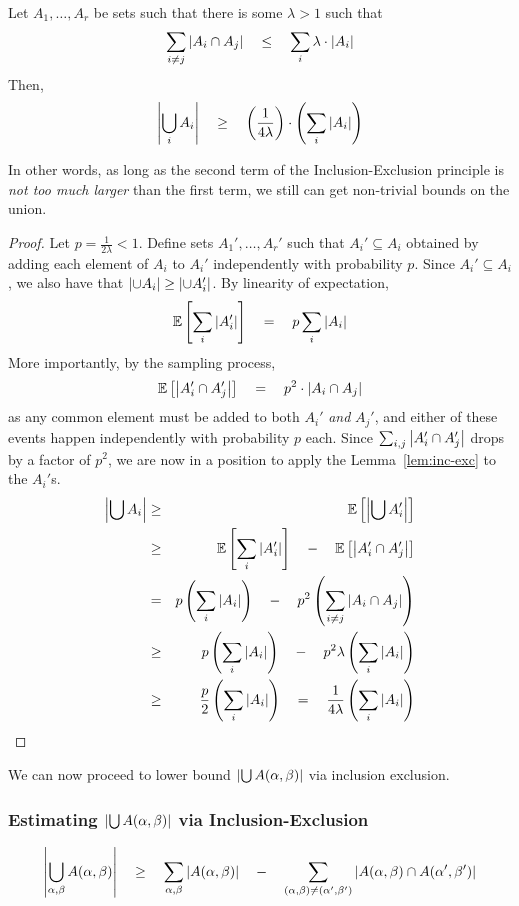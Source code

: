 \documentclass{beatcs}
\newcommand{\spaced}[1]{\quad#1\quad}
\begin{document}
\begin{lemma}\label{lem:str-inc-exc}
Let $A_1,\dots, A_r$ be sets such that there is some $\lambda > 1$ such that
\[
\sum_{i\neq j} \abs{A_i \intersection A_j} \spaced{\leq} \sum_i \lambda \cdot \abs{A_i}
\]
Then, 
\[
\abs{\Union_i A_i} \spaced{\geq} \inparen{\frac{1}{4\lambda}} \cdot \inparen{\sum_i \abs{A_i}}
\]
\end{lemma}

In other words, as long as the second term of the Inclusion-Exclusion principle is \emph{not too much larger} than the first term, we still can get non-trivial bounds on the union. 

\begin{proof}
Let $p = \frac{1}{2\lambda} < 1$. Define sets $A_1',\dots, A_r'$ such that $A_i' \subseteq A_i$ obtained by adding each element of $A_i$ to $A_i'$ independently with probability $p$. Since $A_i' \subseteq A_i$, we also have that $\left|\cup A_i\right| \geq \left|\cup  A_i'\right|$. By linearity of expectation, 
\[
\E\insquare{\sum_i \abs{A_i'}} \spaced{=} p \sum_{i} \abs{A_i} 
\]
More importantly, by the sampling process,
\[
\E\insquare{\abs{A_i' \intersection A_j'}} \spaced{=} p^2 \cdot \abs{A_i \intersection A_j}
\]
as any common element must be added to both $A_i'$ \emph{and} $A_j'$, and either of these events happen independently with probability $p$ each. Since $\sum_{i,j}\left|A_i' \cap A_j'\right|$ drops by a factor of $p^2$, we are now in a position to apply the Lemma~\ref{lem:inc-exc} to the $A_i'$s. 
\begin{eqnarray*}
\abs{\Union A_i} & \geq &  \E\insquare{\abs{\Union A_i'}}\\
& \geq & \E\insquare{\sum_i \abs{A_i'}} \spaced{-} \E\insquare{\abs{A_i' \intersection A_j'}}\\
& = & p \inparen{\sum_i \abs{A_i}} \spaced{-} p^2\inparen{\sum_{i\neq j}\abs{A_i \intersection A_j}}\\
& \geq & p \inparen{\sum_i \abs{A_i}} \spaced{-} p^2 \lambda \inparen{\sum_i \abs{A_i}}\\
& \geq & \frac{p}{2} \inparen{\sum_i \abs{A_i}} \spaced{=} \frac{1}{4\lambda} \inparen{\sum_i \abs{A_i}}
\end{eqnarray*}
\end{proof}

We can now proceed to lower bound $\left|\bigcup A(\alpha, \beta)\right|$ via inclusion exclusion.

\subsubsection*{Estimating $\left|\bigcup A(\alpha, \beta)\right|$ via Inclusion-Exclusion}
\[
\abs{\Union_{\alpha, \beta}A(\alpha,\beta)}\spaced{\geq} \sum_{\alpha,\beta}\abs{A(\alpha, \beta)} \spaced{-} \sum_{(\alpha, \beta)\neq (\alpha',\beta')}\abs{A(\alpha, \beta) \intersection A(\alpha',\beta')}
\]
\end{document}

